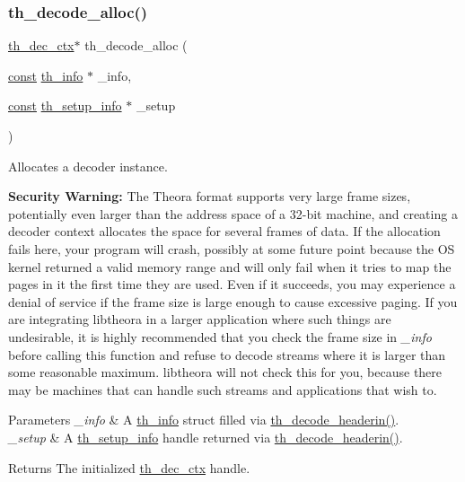 \subsubsection{\texorpdfstring{th\+\_\+decode\+\_\+alloc()}{th\_decode\_alloc()}}
{\footnotesize\ttfamily \hyperlink{theoradec_8h_a843d70bb02563885a8d54b9c1a781729}{th\+\_\+dec\+\_\+ctx}$\ast$ th\+\_\+decode\+\_\+alloc (\begin{DoxyParamCaption}\item[{\hyperlink{zconf_8h_a2c212835823e3c54a8ab6d95c652660e}{const} \hyperlink{structth__info}{th\+\_\+info} $\ast$}]{\+\_\+info,  }\item[{\hyperlink{zconf_8h_a2c212835823e3c54a8ab6d95c652660e}{const} \hyperlink{theoradec_8h_ab71cd2657455cc27d6c0127c66a89f28}{th\+\_\+setup\+\_\+info} $\ast$}]{\+\_\+setup }\end{DoxyParamCaption})}

Allocates a decoder instance.

{\bfseries Security Warning\+:} The Theora format supports very large frame sizes, potentially even larger than the address space of a 32-\/bit machine, and creating a decoder context allocates the space for several frames of data. If the allocation fails here, your program will crash, possibly at some future point because the OS kernel returned a valid memory range and will only fail when it tries to map the pages in it the first time they are used. Even if it succeeds, you may experience a denial of service if the frame size is large enough to cause excessive paging. If you are integrating libtheora in a larger application where such things are undesirable, it is highly recommended that you check the frame size in {\itshape \+\_\+info} before calling this function and refuse to decode streams where it is larger than some reasonable maximum. libtheora will not check this for you, because there may be machines that can handle such streams and applications that wish to. 
\begin{DoxyParams}{Parameters}
{\em \+\_\+info} & A \hyperlink{structth__info}{th\+\_\+info} struct filled via \hyperlink{group__decfuncs_ga006d01d36fbe64768c571e6a12b7fc50}{th\+\_\+decode\+\_\+headerin()}. \\
\hline
{\em \+\_\+setup} & A \hyperlink{theoradec_8h_ab71cd2657455cc27d6c0127c66a89f28}{th\+\_\+setup\+\_\+info} handle returned via \hyperlink{group__decfuncs_ga006d01d36fbe64768c571e6a12b7fc50}{th\+\_\+decode\+\_\+headerin()}. \\
\hline
\end{DoxyParams}
\begin{DoxyReturn}{Returns}
The initialized \hyperlink{theoradec_8h_a843d70bb02563885a8d54b9c1a781729}{th\+\_\+dec\+\_\+ctx} handle. 
\end{DoxyReturn}

